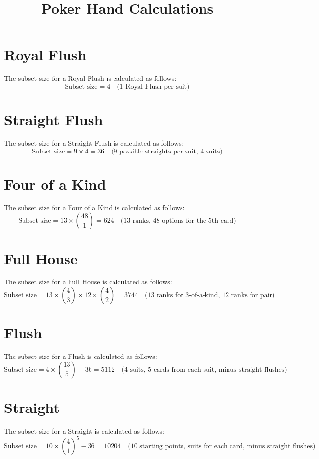 \documentclass{article}
\begin{document}
\title{Poker Hand Calculations}
\maketitle

\section*{Royal Flush}
The subset size for a Royal Flush is calculated as follows:
\[
\text{Subset size} = 4 \quad \text{(1 Royal Flush per suit)}
\]


\section*{Straight Flush}
The subset size for a Straight Flush is calculated as follows:
\[
\text{Subset size} = 9 \times 4 = 36 \quad \text{(9 possible straights per suit, 4 suits)}
\]


\section*{Four of a Kind}
The subset size for a Four of a Kind is calculated as follows:
\[
\text{Subset size} = 13 \times \binom{48}{1} = 624 \quad \text{(13 ranks, 48 options for the 5th card)}
\]


\section*{Full House}
The subset size for a Full House is calculated as follows:
\[
\text{Subset size} = 13 \times \binom{4}{3} \times 12 \times \binom{4}{2} = 3744 \quad \text{(13 ranks for 3-of-a-kind, 12 ranks for pair)}
\]


\section*{Flush}
The subset size for a Flush is calculated as follows:
\[
\text{Subset size} = 4 \times \binom{13}{5} - 36 = 5112 \quad \text{(4 suits, 5 cards from each suit, minus straight flushes)}
\]


\section*{Straight}
The subset size for a Straight is calculated as follows:
\[
\text{Subset size} = 10 \times \binom{4}{1}^5 - 36 = 10204 \quad \text{(10 starting points, suits for each card, minus straight flushes)}
\]
\end{document}
